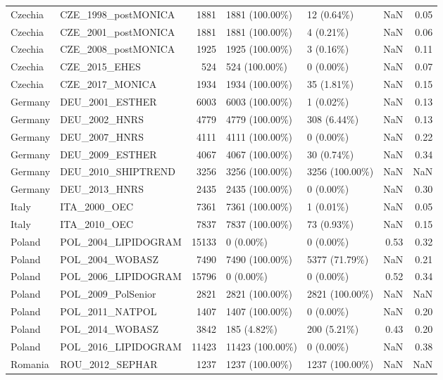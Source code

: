 \begin{longtable}{llrllrr}
Czechia & CZE\_1998\_postMONICA & 1881 & 1881 (100.00\%) & 12 (0.64\%) & NaN & 0.05\\
Czechia & CZE\_2001\_postMONICA & 1881 & 1881 (100.00\%) & 4 (0.21\%) & NaN & 0.06\\
Czechia & CZE\_2008\_postMONICA & 1925 & 1925 (100.00\%) & 3 (0.16\%) & NaN & 0.11\\
Czechia & CZE\_2015\_EHES & 524 & 524 (100.00\%) & 0 (0.00\%) & NaN & 0.07\\
Czechia & CZE\_2017\_MONICA & 1934 & 1934 (100.00\%) & 35 (1.81\%) & NaN & 0.15\\
\addlinespace
Germany & DEU\_2001\_ESTHER & 6003 & 6003 (100.00\%) & 1 (0.02\%) & NaN & 0.13\\
Germany & DEU\_2002\_HNRS & 4779 & 4779 (100.00\%) & 308 (6.44\%) & NaN & 0.13\\
Germany & DEU\_2007\_HNRS & 4111 & 4111 (100.00\%) & 0 (0.00\%) & NaN & 0.22\\
Germany & DEU\_2009\_ESTHER & 4067 & 4067 (100.00\%) & 30 (0.74\%) & NaN & 0.34\\
Germany & DEU\_2010\_SHIPTREND & 3256 & 3256 (100.00\%) & 3256 (100.00\%) & NaN & NaN\\
Germany & DEU\_2013\_HNRS & 2435 & 2435 (100.00\%) & 0 (0.00\%) & NaN & 0.30\\
\addlinespace
Italy & ITA\_2000\_OEC & 7361 & 7361 (100.00\%) & 1 (0.01\%) & NaN & 0.05\\
Italy & ITA\_2010\_OEC & 7837 & 7837 (100.00\%) & 73 (0.93\%) & NaN & 0.15\\
\addlinespace
Poland & POL\_2004\_LIPIDOGRAM & 15133 & 0 (0.00\%) & 0 (0.00\%) & 0.53 & 0.32\\
Poland & POL\_2004\_WOBASZ & 7490 & 7490 (100.00\%) & 5377 (71.79\%) & NaN & 0.21\\
Poland & POL\_2006\_LIPIDOGRAM & 15796 & 0 (0.00\%) & 0 (0.00\%) & 0.52 & 0.34\\
Poland & POL\_2009\_PolSenior & 2821 & 2821 (100.00\%) & 2821 (100.00\%) & NaN & NaN\\
Poland & POL\_2011\_NATPOL & 1407 & 1407 (100.00\%) & 0 (0.00\%) & NaN & 0.20\\
Poland & POL\_2014\_WOBASZ & 3842 & 185 (4.82\%) & 200 (5.21\%) & 0.43 & 0.20\\
Poland & POL\_2016\_LIPIDOGRAM & 11423 & 11423 (100.00\%) & 0 (0.00\%) & NaN & 0.38\\
\addlinespace
Romania & ROU\_2012\_SEPHAR & 1237 & 1237 (100.00\%) & 1237 (100.00\%) & NaN & NaN\\

\end{longtable}
